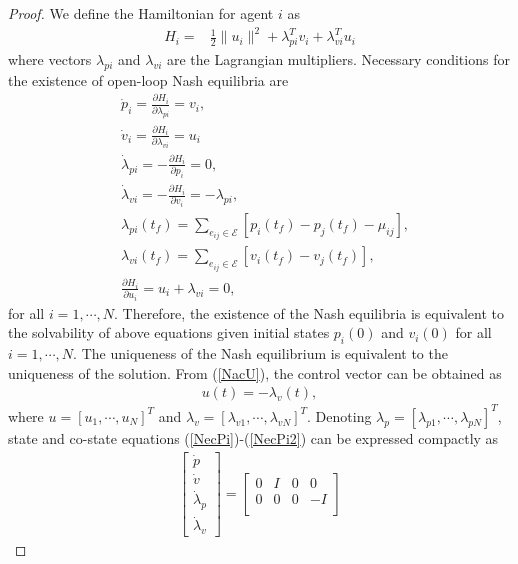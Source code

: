 \documentclass[12pt,draftcls,onecolumn]{IEEEtran}  %
\begin{document}
{\begin{proof}
We define the Hamiltonian for agent $i$ as
\begin{align}
H_i=&\frac{1}{2}\|u_i\|^2+ \lambda_{pi}^Tv_i+
\lambda_{vi}^Tu_i
\end{align}
where vectors $\lambda_{pi}$ and $\lambda_{vi}$ are the Lagrangian multipliers. Necessary conditions for the existence of open-loop Nash equilibria are
\begin{subequations}\begin{align}
&\dot{p}_{i}=\frac{\partial H_i}{\partial \lambda_{pi}}=v_i,\label{NecPi}\\ &\dot{v}_{i}=\frac{\partial H_i}{\partial \lambda_{vi}}=u_i\label{NecPi1}\\
&\dot{\lambda}_{pi}=-\frac{\partial H_i}{\partial p_{i}}= 0,\\
&\dot{\lambda}_{vi}=-\frac{\partial H_i}{\partial v_{i}}= -\lambda_{pi},\label{NecPi2}\\
&\lambda_{pi}(t_f)= \sum_{e_{ij}\in\mathcal{E}}[p_{i}(t_f)-p_{j}(t_f)-\mu_{ij}],\label{NecPi3}\\
&\lambda_{vi}(t_f)= \sum_{e_{ij}\in\mathcal{E}}[v_{i}(t_f)-v_{j}(t_f)],\label{NecPi4}\\
&\frac{\partial H_i}{\partial u_i}=u_i+\lambda_{vi} =0,\label{NacU}
\end{align}
\end{subequations}
for all $i=1,\cdots,N$. Therefore, the existence of the Nash equilibria is equivalent to the solvability of above equations given initial states $p_i(0)$ and $v_i(0)$ for all $i=1,\cdots,N$. The uniqueness of the Nash equilibrium is equivalent to the uniqueness of the solution. From (\ref{NacU}), the control vector can be obtained as
\begin{align}
u(t)=-\lambda_{v}(t),\label{ulambda}
\end{align}
where $u=[u_1,\cdots,u_N]^T$ and $\lambda_v=[\lambda_{v1},\cdots,\lambda_{vN}]^T$.
Denoting $\lambda_p=[\lambda_{p1},\cdots,\lambda_{pN}]^T$, state and co-state equations (\ref{NecPi})-(\ref{NecPi2}) can be expressed compactly as
\begin{align*}
\begin{bmatrix}
\dot{p}\\
\dot{v}\\
\dot{\lambda}_{p}\\
\dot{\lambda}_{v}
\end{bmatrix}=\begin{bmatrix}
0&I&0&0\\
0&0&0&-I\\

\end{bmatrix}
\end{align*}
\end{proof}}
\end{document}

